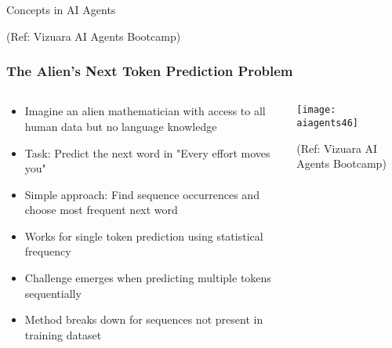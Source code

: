 \begin{frame}[fragile]\frametitle{}
\begin{center}
{\Large Concepts in AI Agents}

{\tiny (Ref: Vizuara AI Agents Bootcamp)}
\end{center}
\end{frame}

\begin{frame}[fragile]\frametitle{The Alien's Next Token Prediction Problem}

\begin{columns}
    \begin{column}[T]{0.6\linewidth}
      \begin{itemize}
	  \item Imagine an alien mathematician with access to all human data but no language knowledge
	  \item Task: Predict the next word in "Every effort moves you"
	  \item Simple approach: Find sequence occurrences and choose most frequent next word
	  \item Works for single token prediction using statistical frequency
	  \item Challenge emerges when predicting multiple tokens sequentially
	  \item Method breaks down for sequences not present in training dataset
	  \end{itemize}

    \end{column}
    \begin{column}[T]{0.4\linewidth}
		\begin{center}
		\texttt{[image: aiagents46]}

		{\tiny (Ref: Vizuara AI Agents Bootcamp)}

		\end{center}	
    \end{column}
  \end{columns}
  
\end{frame}

